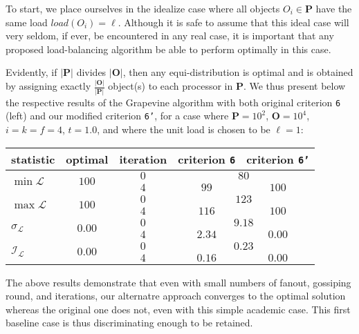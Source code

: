To start, we place ourselves in the idealize case where all objects
$O_i\in\mathbf{P}$ have the same load $load(O_i)=\ell$.
Although it is safe to assume that this ideal case will very seldom,
if ever, be encountered in any real case, it is important that any
proposed load-balancing algorithm be able to perform optimally in this
case.

Evidently, if $\vert\mathbf{P}\vert$ divides $\vert\mathbf{O}\vert$,
then any  equi-distribution is optimal and is obtained by assigning
exactly $\tfrac{\vert\mathbf{O}\vert}{\vert\mathbf{P}\vert}$ object(s)
to each processor in $\mathbf{P}$.
We thus present below the respective results of the
Grapevine algorithm with both original criterion \texttt{6} (left) and
our modified criterion \texttt{6'}, for a case where
$\mathbf{P}=10^2$, $\mathbf{O}=10^4$, $i=k=f=4$, $t=1.0$, and where
the unit load is chosen to be $\ell=1$:
\begin{center}
\begin{tabular}{lcccc}
\hline
statistic & optimal & iteration & criterion \texttt{6} & criterion \texttt{6'} \\
\hline\hline
\multirow{2}{*}{$\min{\mathcal{L}}$}
&\multirow{2}{*}{$100$}
&$0$ &\multicolumn{2}{c}{$80$} \\
&&$4$ &$99$    &$100$ \\\hline
\multirow{2}{*}{$\max{\mathcal{L}}$}
&\multirow{2}{*}{$100$}
&$0$ &\multicolumn{2}{c}{$123$} \\
&&$4$ &$116$   &$100$ \\\hline
\multirow{2}{*}{$\sigma_{\mathcal{L}}$}
&\multirow{2}{*}{$0.00$}
&$0$ &\multicolumn{2}{c}{$9.18$} \\
&&$4$ &$2.34$  &$0.00$ \\\hline
\multirow{2}{*}{$\mathcal{I}_\mathcal{L}$}
&\multirow{2}{*}{$0.00$}
&$0$ &\multicolumn{2}{c}{$0.23$} \\
&&$4$ &$0.16$  &$0.00$ \\\hline
\end{tabular}
\end{center}
The above results demonstrate that even with small numbers of fanout,
gossiping round, and iterations, our alternatre approach converges to
the optimal solution whereas the original one does not, even with this
simple academic case. This first baseline case is thus discriminating
enough to be retained.


